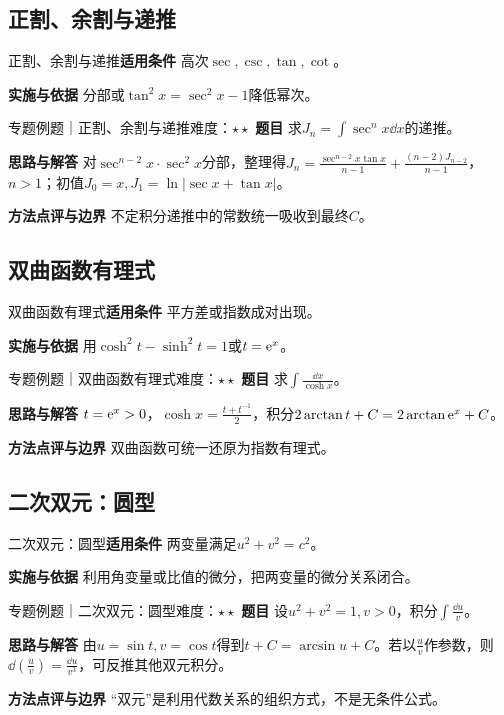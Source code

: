 \subsection{正割、余割与递推}\label{mat:integrals_methods:i13}
\begin{method}{正割、余割与递推}\textbf{适用条件} 高次$\sec,\csc,\tan,\cot$。\par\textbf{实施与依据} 分部或$\tan^2x=\sec^2x-1$降低幂次。\end{method}
\begin{example}{专题例题｜正割、余割与递推}{难度：$\star\star$}
\textbf{题目} 求$J_n=\int\sec^nx\dd x$的递推。\par\textbf{思路与解答} 对$\sec^{n-2}x\cdot\sec^2x$分部，整理得$J_n=\frac{\sec^{n-2}x\tan x}{n-1}+\frac{(n-2)J_{n-2}}{n-1}$，$n>1$；初值$J_0=x,J_1=\ln|\sec x+\tan x|$。\par\textbf{方法点评与边界} 不定积分递推中的常数统一吸收到最终$C$。
\end{example}
\subsection{双曲函数有理式}\label{mat:integrals_methods:i14}
\begin{method}{双曲函数有理式}\textbf{适用条件} 平方差或指数成对出现。\par\textbf{实施与依据} 用$\cosh^2t-\sinh^2t=1$或$t=\mathrm{e}^x$。\end{method}
\begin{example}{专题例题｜双曲函数有理式}{难度：$\star\star$}
\textbf{题目} 求$\int\frac{\dd x}{\cosh x}$。\par\textbf{思路与解答} $t=\mathrm{e}^x>0$，$\cosh x=\frac{t+t^{-1}}{2}$，积分$2\arctan t+C=2\arctan\mathrm{e}^x+C$。\par\textbf{方法点评与边界} 双曲函数可统一还原为指数有理式。
\end{example}
\subsection{二次双元：圆型}\label{mat:integrals_methods:i15}
\begin{method}{二次双元：圆型}\textbf{适用条件} 两变量满足$u^2+v^2=c^2$。\par\textbf{实施与依据} 利用角变量或比值的微分，把两变量的微分关系闭合。\end{method}
\begin{example}{专题例题｜二次双元：圆型}{难度：$\star\star$}
\textbf{题目} 设$u^2+v^2=1,v>0$，积分$\int\frac{\dd u}{v}$。\par\textbf{思路与解答} 由$u=\sin t,v=\cos t$得到$t+C=\arcsin u+C$。若以$\frac{u}{v}$作参数，则$\dd(\frac{u}{v})=\frac{\dd u}{v^3}$，可反推其他双元积分。\par\textbf{方法点评与边界} “双元”是利用代数关系的组织方式，不是无条件公式。
\end{example}
